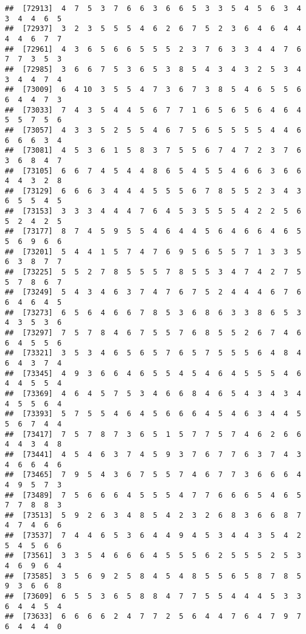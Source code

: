 \documentclass[
]{book}
\begin{document}
\begin{verbatim}
##  [72913]  4  7  5  3  7  6  6  3  6  6  5  3  3  5  4  5  6  3  4  3  4  4  6  5
##  [72937]  3  2  3  5  5  5  4  6  2  6  7  5  2  3  6  4  6  4  4  4  4  6  7  7
##  [72961]  4  3  6  5  6  6  5  5  5  2  3  7  6  3  3  4  4  7  6  7  7  3  5  3
##  [72985]  3  6  6  7  5  3  6  5  3  8  5  4  3  4  3  2  5  3  4  3  4  4  7  4
##  [73009]  6  4 10  3  5  5  4  7  3  6  7  3  8  5  4  6  5  5  6  6  4  4  7  3
##  [73033]  7  4  3  5  4  4  5  6  7  7  1  6  5  6  5  6  4  6  4  5  5  7  5  6
##  [73057]  4  3  3  5  2  5  5  4  6  7  5  6  5  5  5  5  4  4  6  6  6  6  3  4
##  [73081]  4  5  3  6  1  5  8  3  7  5  5  6  7  4  7  2  3  7  6  3  6  8  4  7
##  [73105]  6  6  7  4  5  4  4  8  6  5  4  5  5  4  6  6  3  6  6  4  4  3  2  8
##  [73129]  6  6  6  3  4  4  4  5  5  5  6  7  8  5  5  2  3  4  3  6  5  5  4  5
##  [73153]  3  3  3  4  4  4  7  6  4  5  3  5  5  5  4  2  2  5  6  5  2  4  2  5
##  [73177]  8  7  4  5  9  5  5  4  6  4  4  5  6  4  6  6  4  6  5  5  6  9  6  6
##  [73201]  5  4  4  1  5  7  4  7  6  9  5  6  5  5  7  1  3  3  5  6  3  8  7  7
##  [73225]  5  5  2  7  8  5  5  5  7  8  5  5  3  4  7  4  2  7  5  5  7  8  6  7
##  [73249]  5  4  3  4  6  3  7  4  7  6  7  5  2  4  4  4  6  7  6  6  4  6  4  5
##  [73273]  6  5  6  4  6  6  7  8  5  3  6  8  6  3  3  8  6  5  3  4  3  5  3  6
##  [73297]  7  5  7  8  4  6  7  5  5  7  6  8  5  5  2  6  7  4  6  6  4  5  5  6
##  [73321]  3  5  3  4  6  5  6  5  7  6  5  7  5  5  5  6  4  8  4  6  4  3  7  4
##  [73345]  4  9  3  6  6  4  6  5  5  4  5  4  6  4  5  5  5  4  6  4  4  5  5  4
##  [73369]  4  6  4  5  7  5  3  4  6  6  8  4  6  5  4  3  4  3  4  4  5  5  6  4
##  [73393]  5  7  5  5  4  6  4  5  6  6  6  4  5  4  6  3  4  4  5  5  6  7  4  4
##  [73417]  7  5  7  8  7  3  6  5  1  5  7  7  5  7  4  6  2  6  6  4  4  3  4  8
##  [73441]  4  5  4  6  3  7  4  5  9  3  7  6  7  7  6  3  7  4  3  4  6  6  4  6
##  [73465]  7  9  5  4  3  6  7  5  5  7  4  6  7  7  3  6  6  6  4  4  9  5  7  3
##  [73489]  7  5  6  6  6  4  5  5  5  4  7  7  6  6  6  5  4  6  5  7  7  8  8  3
##  [73513]  5  9  2  6  3  4  8  5  4  2  3  2  6  8  3  6  6  8  7  4  7  4  6  6
##  [73537]  7  4  4  6  5  3  6  4  4  9  4  5  3  4  4  3  5  4  2  5  4  5  6  6
##  [73561]  3  3  5  4  6  6  6  4  5  5  5  6  2  5  5  5  2  5  3  4  6  9  6  4
##  [73585]  3  5  6  9  2  5  8  4  5  4  8  5  5  6  5  8  7  8  5  9  3  6  6  8
##  [73609]  6  5  5  3  6  5  8  8  4  7  7  5  5  4  4  4  5  3  3  6  4  4  5  4
##  [73633]  6  6  6  6  2  4  7  7  2  5  6  4  4  7  6  4  7  9  7  6  4  4  4  0

\end{verbatim}
\end{document}
